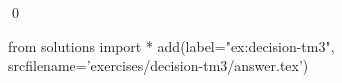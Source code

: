
\begin{ex} 
  \label{ex:decision-tm3}
  
  \qed
\end{ex} 
\begin{python0}
from solutions import *
add(label="ex:decision-tm3",
    srcfilename='exercises/decision-tm3/answer.tex') 
\end{python0}
